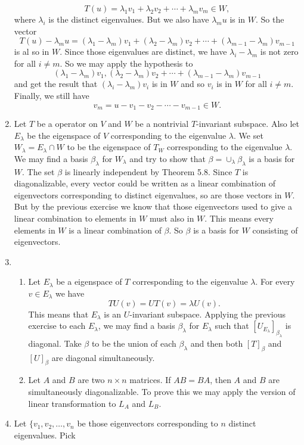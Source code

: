 \begin{enumerate}
\[T(u)=\lambda_1v_1+\lambda_2v_2+\cdots +\lambda_mv_m\in W,\]
where $\lambda_i$ is the distinct eigenvalues.
But we also have $\lambda_mu$ is in $W$. So the vector
\[T(u)-\lambda_mu=(\lambda_1-\lambda_m)v_1+(\lambda_2-\lambda_m)v_2+\cdots +(\lambda_{m-1}-\lambda_m)v_{m-1}\]
is al so in $W$. Since those eigenvalues are distinct, we have $\lambda_i-\lambda_m$ is not zero for all $i\neq m$. So we may apply the hypothesis to 
\[(\lambda_1-\lambda_m)v_1,(\lambda_2-\lambda_m)v_2+\cdots +(\lambda_{m-1}-\lambda_m)v_{m-1}\]
and get the result that $(\lambda_i-\lambda_m)v_i$ is in $W$ and so $v_i$ is in $W$ for all $i\neq m$. Finally, we still have 
\[v_m=u-v_1-v_2-\cdots -v_{m-1}\in W.\]
\item Let $T$ be a operator on $V$ and $W$ be a nontrivial $T$-invariant subspace. Also let $E_{\lambda}$ be the eigenspace of $V$ corresponding to the eigenvalue $\lambda$. We set $W_{\lambda}=E_{\lambda}\cap W$ to be the eigenspace of $T_W$ corresponding to the eigenvalue $\lambda$. We may find a basis $\beta_{\lambda}$ for $W_{\lambda}$ and try to show that $\beta=\cup_{\lambda}\beta_{\lambda}$ is a basis for $W$. The set $\beta $ is linearly independent by Theorem 5.8. Since $T$ is diagonalizable, every vector could be written as a linear combination of eigenvectors corresponding to distinct eigenvalues, so are those vectors in $W$. But by the previous exercise we know that those eigenvectors used to give a linear combination to elements in $W$ must also in $W$. This means every elements in $W$ is a linear combination of $\beta$. So $\beta $ is a basis for $W$ consisting of eigenvectors.
\item \begin{enumerate}
\item Let $E_{\lambda}$ be a eigenspace of $T$ corresponding to the eigenvalue $\lambda$. For every $v\in E_{\lambda}$ we have 
\[TU(v)=UT(v)=\lambda U(v).\]
This means that $E_{\lambda}$ is an $U$-invariant subspace. Applying the previous exercise to each $E_{\lambda}$, we may find a basis $\beta_{\lambda}$ for $E_{\lambda}$ such that $[U_{E_{\lambda}}]_{\beta_{\lambda}}$ is diagonal. Take $\beta $ to be the union of each $\beta_{\lambda}$ and then both $[T]_{\beta}$ and $[U]_{\beta}$ are diagonal simultaneously.
\item Let $A$ and $B$ are two $n\times n$ matrices. If $AB=BA$, then $A$ and $B$ are simultaneously diagonalizable. To prove this we may apply the version of linear transformation to $L_A$ and $L_B$.
\end{enumerate}
\item Let $\{v_1,v_2,\ldots ,v_n$ be those eigenvectors corresponding to $n$ distinct eigenvalues. Pick 

\end{enumerate}
